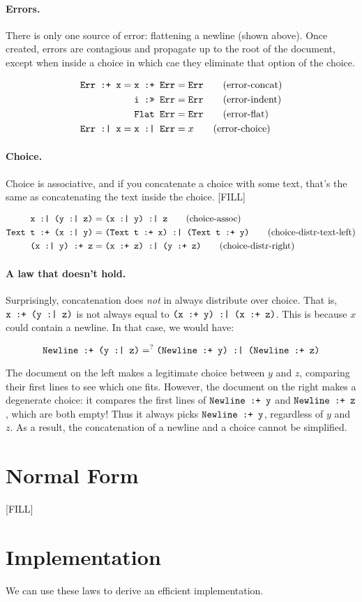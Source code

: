 \documentclass{article}
\newcommand{\ind}[2]{\texttt{#1 :>> #2}}
\newcommand{\cat}[2]{\texttt{#1 :+ #2}}
\newcommand{\choice}[2]{\texttt{#1 :| #2}}
\newcommand{\txt}[1]{\texttt{Text #1}}
\newcommand{\err}{\texttt{Err}}
\newcommand{\nl}{\texttt{Newline}}
\renewcommand{\flat}[1]{\texttt{Flat #1}}
\begin{document}
\paragraph{Errors.}
There is only one source of error: flattening a newline (shown above). Once created, errors are
contagious and propagate up to the root of the document, except when inside a choice in which cae
they eliminate that option of the choice.

\begin{align*}
  \cat{\err}{x} = \cat{x}{\err} &= \err
    \tag{error-concat} \\
  \ind{i}{\err} &= \err
    \tag{error-indent} \\
  \flat{\err} &= \err
    \tag{error-flat} \\
  \choice{\err}{x} = \choice{x}{\err} &= x
    \tag{error-choice}
\end{align*}

\paragraph{Choice.}
Choice is associative, and if you concatenate a choice with some text, that's the same as
concatenating the text inside the choice. [FILL]

\begin{align*}
  \choice{x}{(\choice{y}{z})} &= \choice{(\choice{x}{y})}{z}
    \tag{choice-assoc} \\
  \cat{\txt{t}}{(\choice{x}{y})} &= \choice{(\cat{\txt{t}}{x})}{(\cat{\txt{t}}{y})}
    \tag{choice-distr-text-left} \\
  \cat{(\choice{x}{y})}{z} &= \choice{(\cat{x}{z})}{(\cat{y}{z})}
    \tag{choice-distr-right}
\end{align*}

\paragraph{A law that doesn't hold.}
Surprisingly, concatenation does \emph{not} in always distribute over choice. That is,
$\cat{x}{(\choice{y}{z})}$ is not always equal to $\choice{(\cat{x}{y})}{(\cat{x}{z})}$.  This is
because $x$ could contain a newline. In that case, we would have:

\[ \cat{\nl}{(\choice{y}{z})} =^? \choice{(\cat{\nl}{y})}{(\cat{\nl}{z})} \]

The document on the left makes a legitimate choice between $y$ and $z$, comparing their first lines
to see which one fits. However, the document on the right makes a degenerate choice: it compares the
first lines of $\cat{\nl}{y}$ and $\cat{\nl}{z}$, which are both empty! Thus it always picks
$\cat{\nl}{y}$, regardless of $y$ and $z$.  As a result, the concatenation of a newline and a choice
cannot be simplified.

\section{Normal Form}

[FILL]

\section{Implementation}

We can use these laws to derive an efficient implementation.
\end{document}
